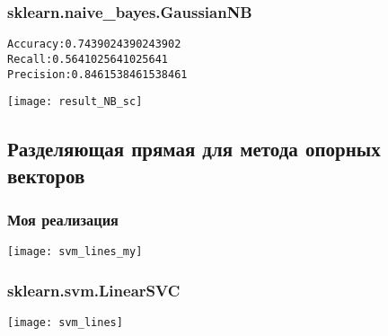 \subsubsection{sklearn.naive\_bayes.GaussianNB}
\begin{alltt}
Accuracy: 0.7439024390243902
Recall: 0.5641025641025641
Precision: 0.8461538461538461
\end{alltt}
\begin{center}
\texttt{[image: result\_NB\_sc]}
\end{center}
\pagebreak

\subsection{Разделяющая прямая для метода опорных векторов}
\subsubsection{Моя реализация}
\begin{center}
\texttt{[image: svm\_lines\_my]}
\end{center}
\pagebreak

\subsubsection{sklearn.svm.LinearSVC}
\begin{center}
\texttt{[image: svm\_lines]}
\end{center}

\pagebreak
